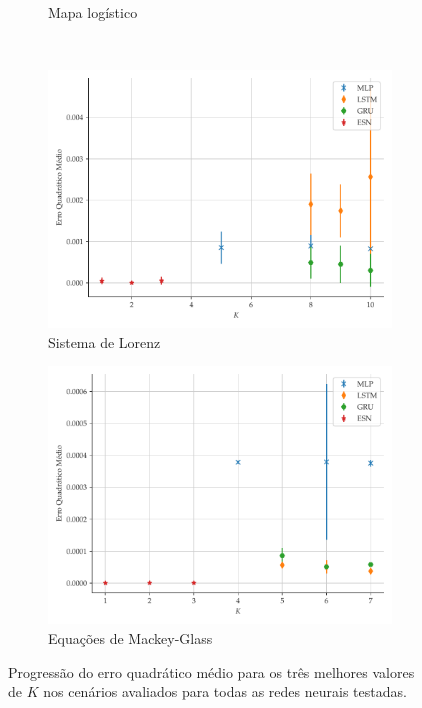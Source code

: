 \documentclass[a4paper, 12pt]{article}
\begin{document}
\begin{figure}[!ht]
\begin{subfigure}[t]{0.45\textwidth}
         \caption{Mapa logístico}
     \end{subfigure}
     \\
     \centering
     \begin{subfigure}[t]{0.45\textwidth}
         \includegraphics[scale=0.4]{lorenz-3best.pdf}
         \caption{Sistema de Lorenz}
     \end{subfigure}
     \centering
     \begin{subfigure}[t]{0.45\textwidth} 
         \includegraphics[scale=0.4]{mackeyglass-3best.pdf}
         \caption{Equações de Mackey-Glass}
     \end{subfigure}  
     \centering   
     \caption{Progressão do erro quadrático médio para os três melhores valores de $K$ nos cenários avaliados para todas as redes neurais testadas.}
     \label{fig:mse-progression-3best}
\end{figure}
\end{document}
